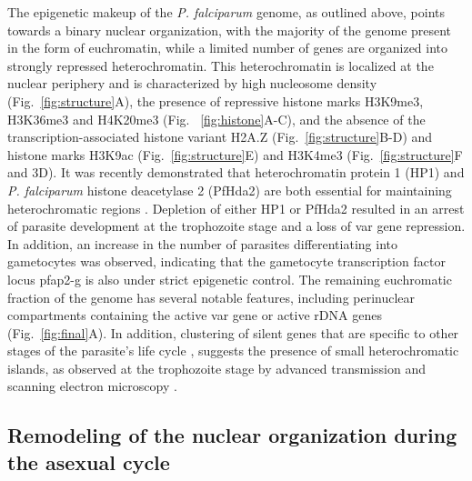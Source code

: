 The epigenetic makeup of the \textit{P. falciparum} genome, as outlined above, points
towards a binary nuclear organization, with the majority of the genome present
in the form of euchromatin, while a limited number of genes are organized into
strongly repressed heterochromatin. This heterochromatin is localized at the
nuclear periphery and is characterized by high nucleosome density
(Fig.~\ref{fig:structure}A),
the presence of repressive histone marks H3K9me3, H3K36me3 and H4K20me3 (Fig.
~\ref{fig:histone}A-C), and the absence of the transcription-associated histone variant H2A.Z
(Fig.~\ref{fig:structure}B-D) and histone marks H3K9ac (Fig.~\ref{fig:structure}E) and H3K4me3
(Fig.~\ref{fig:structure}F and 3D).
It was recently demonstrated that heterochromatin protein 1 (HP1) and \textit{P.
falciparum} histone deacetylase 2 (PfHda2) are both essential for maintaining
heterochromatic regions \citep{brancucci:heterochromatin, coleman:plasmodium}.
Depletion of either HP1 or PfHda2 resulted in
an arrest of parasite development at the trophozoite stage and a loss of var
gene repression. In addition, an increase in the number of parasites
differentiating into gametocytes was observed, indicating that the gametocyte
transcription factor locus pfap2-g is also under strict epigenetic control.
The remaining euchromatic fraction of the genome has several notable features,
including perinuclear compartments containing the active var gene or active
rDNA genes (Fig.~\ref{fig:final}A). In addition, clustering of silent genes that are
specific to other stages of the parasite’s life cycle
\citep{ay:three-dimensional}, suggests the
presence of small heterochromatic islands, as observed at the trophozoite
stage by advanced transmission and scanning electron microscopy
\citep{weiner:3d}.

\subsection{Remodeling of the nuclear organization during the asexual cycle}

